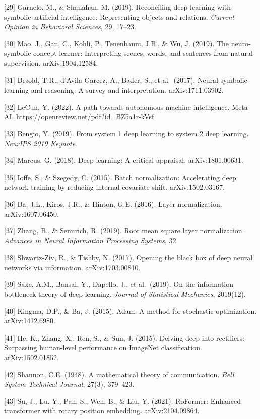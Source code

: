 \documentclass[12pt]{article}
\begin{document}
{[}29{]} Garnelo, M., \& Shanahan, M. (2019). Reconciling deep learning
with symbolic artificial intelligence: Representing objects and
relations. \emph{Current Opinion in Behavioral Sciences}, 29, 17--23.

{[}30{]} Mao, J., Gan, C., Kohli, P., Tenenbaum, J.B., \& Wu, J. (2019).
The neuro-symbolic concept learner: Interpreting scenes, words, and
sentences from natural supervision. arXiv:1904.12584.

{[}31{]} Besold, T.R., d'Avila Garcez, A., Bader, S., et al.~(2017).
Neural-symbolic learning and reasoning: A survey and interpretation.
arXiv:1711.03902.

{[}32{]} LeCun, Y. (2022). A path towards autonomous machine
intelligence. Meta AI. https://openreview.net/pdf?id=BZ5a1r-kVsf

{[}33{]} Bengio, Y. (2019). From system 1 deep learning to system 2 deep
learning. \emph{NeurIPS 2019 Keynote}.

{[}34{]} Marcus, G. (2018). Deep learning: A critical appraisal.
arXiv:1801.00631.

{[}35{]} Ioffe, S., \& Szegedy, C. (2015). Batch normalization:
Accelerating deep network training by reducing internal covariate shift.
arXiv:1502.03167.

{[}36{]} Ba, J.L., Kiros, J.R., \& Hinton, G.E. (2016). Layer
normalization. arXiv:1607.06450.

{[}37{]} Zhang, B., \& Sennrich, R. (2019). Root mean square layer
normalization. \emph{Advances in Neural Information Processing Systems},
32.

{[}38{]} Shwartz-Ziv, R., \& Tishby, N. (2017). Opening the black box of
deep neural networks via information. arXiv:1703.00810.

{[}39{]} Saxe, A.M., Bansal, Y., Dapello, J., et al.~(2019). On the
information bottleneck theory of deep learning. \emph{Journal of
Statistical Mechanics}, 2019(12).

{[}40{]} Kingma, D.P., \& Ba, J. (2015). Adam: A method for stochastic
optimization. arXiv:1412.6980.

{[}41{]} He, K., Zhang, X., Ren, S., \& Sun, J. (2015). Delving deep
into rectifiers: Surpassing human-level performance on ImageNet
classification. arXiv:1502.01852.

{[}42{]} Shannon, C.E. (1948). A mathematical theory of communication.
\emph{Bell System Technical Journal}, 27(3), 379--423.

{[}43{]} Su, J., Lu, Y., Pan, S., Wen, B., \& Liu, Y. (2021). RoFormer:
Enhanced transformer with rotary position embedding. arXiv:2104.09864.
\end{document}
